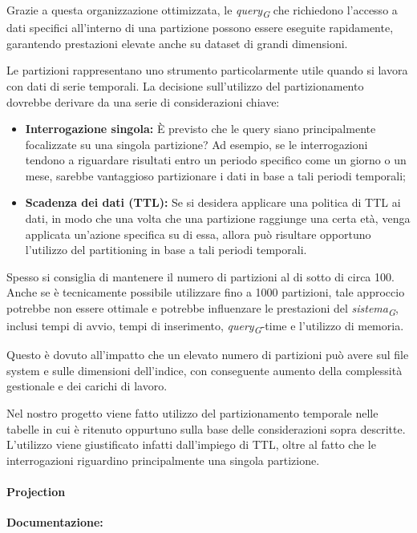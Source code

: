 Grazie a questa organizzazione ottimizzata, le \textit{query}\textsubscript{\textit{G}} che richiedono l'accesso a dati specifici all'interno di una partizione possono essere eseguite rapidamente, garantendo prestazioni elevate anche su dataset di grandi dimensioni.

Le partizioni rappresentano uno strumento particolarmente utile quando si lavora con dati di serie temporali. La decisione sull'utilizzo del partizionamento dovrebbe derivare da una serie di considerazioni chiave:

\begin{itemize}
	\item \textbf{Interrogazione singola:} È previsto che le query siano principalmente focalizzate su una singola partizione? Ad esempio, se le interrogazioni tendono a riguardare risultati entro un periodo specifico come un giorno o un mese, sarebbe vantaggioso partizionare i dati in base a tali periodi temporali;
	\item \textbf{Scadenza dei dati (TTL):} Se si desidera applicare una politica di TTL ai dati, in modo che una volta che una partizione raggiunge una certa età, venga applicata un'azione specifica su di essa, allora può risultare opportuno l'utilizzo del partitioning in base a tali periodi temporali.
\end{itemize}

Spesso si consiglia di mantenere il numero di partizioni al di sotto di circa 100. Anche se è tecnicamente possibile utilizzare fino a 1000 partizioni, tale approccio potrebbe non essere ottimale e potrebbe influenzare le prestazioni del \textit{sistema}\textsubscript{\textit{G}}, inclusi tempi di avvio, tempi di inserimento, \textit{query}\textsubscript{\textit{G}}-time e l'utilizzo di memoria.

Questo è dovuto all'impatto che un elevato numero di partizioni può avere sul file system e sulle dimensioni dell'indice, con conseguente aumento della complessità gestionale e dei carichi di lavoro.

Nel nostro progetto viene fatto utilizzo del partizionamento temporale nelle tabelle in cui è ritenuto oppurtuno sulla base delle considerazioni sopra descritte. L'utilizzo viene giustificato infatti dall'impiego di TTL, oltre al fatto che le interrogazioni riguardino principalmente una singola partizione.
    
\paragraph{Projection}\label{sec:projections}
\textbf{Documentazione:}

